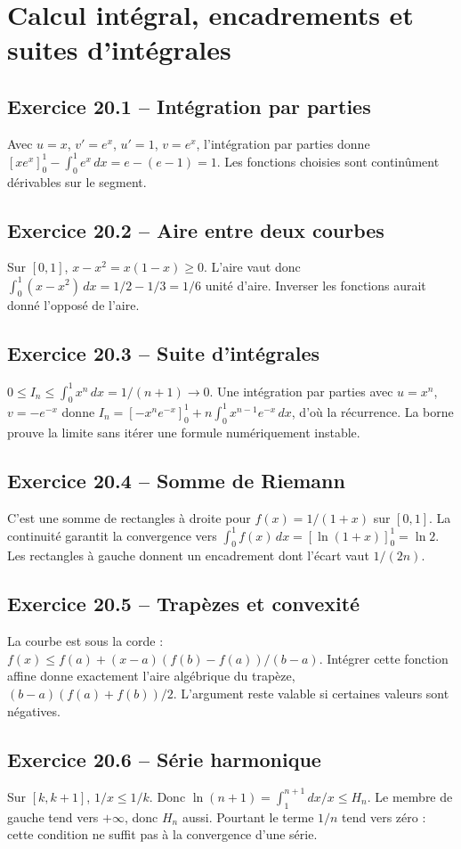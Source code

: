 \chapter{Calcul intégral, encadrements et suites d’intégrales}
\section*{Exercice 20.1 -- Intégration par parties}
Avec $u=x$, $v'=e^x$, $u'=1$, $v=e^x$, l'intégration par parties donne $[xe^x]_0^1-\int_0^1e^x\,dx=e-(e-1)=1$. Les fonctions choisies sont continûment dérivables sur le segment.

\section*{Exercice 20.2 -- Aire entre deux courbes}
Sur $[0,1]$, $x-x^2=x(1-x)\ge0$. L'aire vaut donc $\int_0^1(x-x^2)\,dx=1/2-1/3=1/6$ unité d'aire. Inverser les fonctions aurait donné l'opposé de l'aire.

\section*{Exercice 20.3 -- Suite d’intégrales}
$0\le I_n\le\int_0^1x^n\,dx=1/(n+1)\to0$. Une intégration par parties avec $u=x^n$, $v=-e^{-x}$ donne $I_n=[-x^ne^{-x}]_0^1+n\int_0^1x^{n-1}e^{-x}\,dx$, d'où la récurrence. La borne prouve la limite sans itérer une formule numériquement instable.

\section*{Exercice 20.4 -- Somme de Riemann}
C'est une somme de rectangles à droite pour $f(x)=1/(1+x)$ sur $[0,1]$. La continuité garantit la convergence vers $\int_0^1f(x)\,dx=[\ln(1+x)]_0^1=\ln2$. Les rectangles à gauche donnent un encadrement dont l'écart vaut $1/(2n)$.

\section*{Exercice 20.5 -- Trapèzes et convexité}
La courbe est sous la corde : $f(x)\le f(a)+(x-a)(f(b)-f(a))/(b-a)$. Intégrer cette fonction affine donne exactement l'aire algébrique du trapèze, $(b-a)(f(a)+f(b))/2$. L'argument reste valable si certaines valeurs sont négatives.

\section*{Exercice 20.6 -- Série harmonique}
Sur $[k,k+1]$, $1/x\le1/k$. Donc $\ln(n+1)=\int_1^{n+1}dx/x\le H_n$. Le membre de gauche tend vers $+\infty$, donc $H_n$ aussi. Pourtant le terme $1/n$ tend vers zéro : cette condition ne suffit pas à la convergence d'une série.
